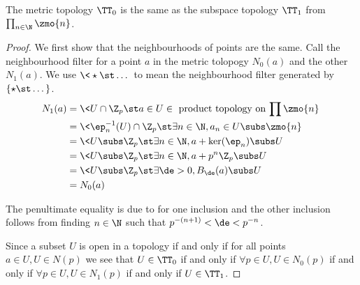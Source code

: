 \begin{prop}
    The metric topology $\TT_0$ is the same as the
    subspace topology $\TT_1$ from $\prod_{n \in \N} \zmo{n}$.
\end{prop}
\begin{proof}
    We first show that the neighbourhoods of points are the same.
    Call the neighbourhood filter for a point $a$ 
    in the metric tolopogy $N_0(a)$
    and the other $N_1(a)$.
    We use $\<\star \st \dots\>$ to mean the neighbourhood filter generated
    by $\{\star \st \dots\}$.
    \begin{align*}
        N_1(a) 
        &= \< U \cap \Z_p \st a \in U \in 
        \text{ product topology on $\prod \zmo{n}$}\>\\
        &=\< \ep_n^{-1} (U) \cap \Z_p \st \exists n \in \N, 
        a_n \in U \subs \zmo{n}\>\\
        &= \< U \subs \Z_p \st \exists n \in \N,
        a + \ker(\ep_n) \subs U\>\\
        &= \< U \subs \Z_p \st \exists n \in \N,
        a + p^n \Z_p \subs U\>\\
        &= \< U \subs \Z_p \st \exists \de > 0, B_\de(a) \subs U\>\\
        &= N_0(a)
    \end{align*}

    The penultimate equality is due to 
     for one 
    inclusion and
    the other inclusion follows from finding $n \in \N$
    such that $p^{-(n+1)} < \de < p^{-n}$.
    
    Since a subset $U$ is open in a topology
    if and only if for all points $a \in U, U \in N(p)$
    we see that $U \in \TT_0$ if and only if 
    $\forall p \in U, U \in N_0(p)$ if and only if
    $\forall p \in U, U \in N_1(p)$ if and only if
    $U \in \TT_1$.
\end{proof}

